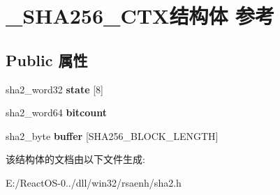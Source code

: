 \hypertarget{struct___s_h_a256___c_t_x}{}\section{\+\_\+\+S\+H\+A256\+\_\+\+C\+T\+X结构体 参考}
\label{struct___s_h_a256___c_t_x}
\subsection*{Public 属性}
\begin{DoxyCompactItemize}
\item 
\mbox{\label{struct___s_h_a256___c_t_x_a7d24b3c34992e9615796203a47de7e2c}} 
sha2\+\_\+word32 {\bfseries state} \mbox{[}8\mbox{]}
\item 
\mbox{\label{struct___s_h_a256___c_t_x_a628c0719942ede8121191a0e6400c03f}} 
sha2\+\_\+word64 {\bfseries bitcount}
\item 
\mbox{\label{struct___s_h_a256___c_t_x_af73b104741a3ea8e22684c18f1e4a7da}} 
sha2\+\_\+byte {\bfseries buffer} \mbox{[}S\+H\+A256\+\_\+\+B\+L\+O\+C\+K\+\_\+\+L\+E\+N\+G\+TH\mbox{]}
\end{DoxyCompactItemize}


该结构体的文档由以下文件生成\+:\begin{DoxyCompactItemize}
\item 
E\+:/\+React\+O\+S-\/0../dll/win32/rsaenh/sha2.\+h\end{DoxyCompactItemize}
